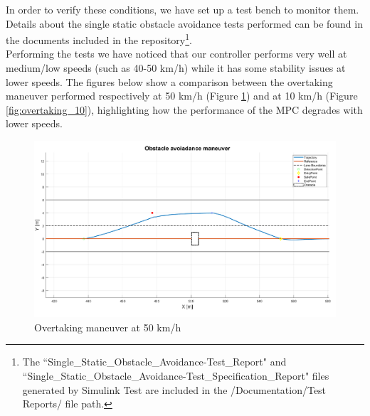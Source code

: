 In order to verify these conditions, we have set up a test bench to monitor them.
Details about the single static obstacle avoidance tests performed can be found in the documents included in the repository\footnote{The ``Single\_Static\_Obstacle\_Avoidance-Test\_Report" and ``Single\_Static\_Obstacle\_Avoidance-Test\_Specification\_Report" files generated by Simulink Test are included in the /Documentation/Test Reports/ file path.}.\\
Performing the tests we have noticed that our controller performs very well at medium/low speeds (such as 40-50 km/h) while it has some stability issues at lower speeds. The figures below show a comparison between the overtaking maneuver performed respectively at 50 km/h (Figure \ref{fig:overtaking_50}) and at 10 km/h (Figure \ref{fig:overtaking_10}), highlighting how the performance of the MPC degrades with lower speeds.

\begin{figure}[H]
    \centering
   \includegraphics[width=1\textwidth,keepaspectratio]{Figures/StaticAvoidance1.png}
    \caption{Overtaking maneuver at 50 km/h}
    \label{fig:overtaking_50}
\end{figure}

